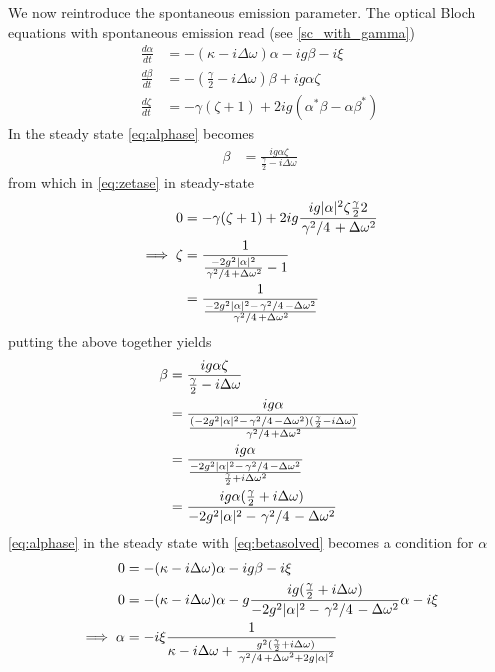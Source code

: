 We now reintroduce the spontaneous emission parameter.
The optical Bloch equations with spontaneous emission read (see \cref{sc_with_gamma})
\begin{align}
  \frac{d \alpha}{dt} &= -(\kappa - i \Delta \omega)\alpha - ig \beta - i\xi\label{eq:alphase}\\
  \frac{d \beta}{dt} &= -(\frac{\gamma}{2}-i\Delta\omega)\beta+ig\alpha\zeta \label{eq:betase}\\
  \frac{d\zeta}{dt} &= -\gamma (\zeta +1)+2ig(\alpha^*\beta-\alpha\beta^*) \label{eq:zetase}
\end{align}
In the steady state \cref{eq:alphase} becomes
\begin{align}
  \beta &= \frac{ig\alpha\zeta}{\frac{\gamma}{2}-i\Delta\omega}
\end{align}
from which in \cref{eq:zetase} in steady-state
\begin{align}
  0 &= -\gamma(\zeta+1)+2ig\frac{ig|\alpha|^2\zeta\frac{\gamma}{2}2}{\flatfrac{\gamma^2}{4}+\Delta\omega^2} \\
  \implies \zeta &= \frac{1}{\frac{-2g^2|\alpha|^2}{\flatfrac{\gamma^2}{4} +\Delta\omega^2}-1} \\
  &= \frac{1}{\frac{-2g^2|\alpha|^2 - \flatfrac{\gamma^2}{4}-\Delta\omega^2}{\flatfrac{\gamma^2}{4} +\Delta\omega^2}}
\end{align}
putting the above together yields
\begin{align}
  \beta &= \frac{ig\alpha\zeta}{\frac{\gamma}{2}-i\Delta\omega}\\
  &= \frac{ig\alpha}{\frac{(-2g^2|\alpha|^2-\flatfrac{\gamma^2}{4}-\Delta\omega^2)(\frac{\gamma}{2}-i\Delta\omega)}{\flatfrac{\gamma^2}{4}+\Delta\omega^2}}\\
  &= \frac{ig\alpha}{\frac{-2g^2|\alpha|^2-\flatfrac{\gamma^2}{4}-\Delta\omega^2}{\frac{\gamma}{2}+i\Delta\omega^2}}\\
  &= \frac{ig\alpha(\frac{\gamma}{2}+i\Delta\omega)}{-2g^2|\alpha|^2-\flatfrac{\gamma^2}{4}-\Delta\omega^2} \label{eq:betasolved}
\end{align}
\cref{eq:alphase} in the steady state with  \cref{eq:betasolved} becomes a condition for $\alpha$
\begin{align} %
  0&=-(\kappa-i\Delta\omega)\alpha-ig\beta-i\xi \\
  0&=-{(\kappa-i\Delta\omega)}\alpha-g\frac{ig(\frac{\gamma}{2}+i\Delta\omega)}{-2g^2|\alpha|^2-\flatfrac{\gamma^2}{4}-\Delta\omega^2}\alpha-i\xi \\
\implies \alpha &= -i\xi \frac{1}{\kappa-i\Delta\omega+\frac{g^2(\frac{\gamma}{2}+i\Delta\omega)}{\flatfrac{\gamma^2}{4}+{\Delta\omega}^2+2g{|\alpha|}^2}}\label{eq:alphadetdiss}
\end{align}


